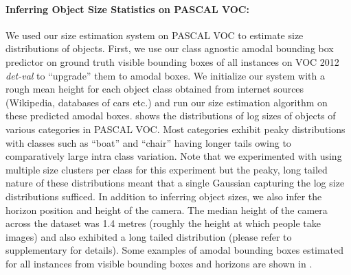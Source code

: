 \paragraph{Inferring Object Size Statistics on PASCAL VOC:} We used our size estimation system on PASCAL VOC to estimate size distributions of objects. First, we use our class agnostic amodal bounding box predictor on ground truth visible bounding boxes of all instances on VOC 2012 \textit{det-val} to ``upgrade'' them to amodal boxes. We initialize our system with a rough mean height for each object class obtained from internet sources (Wikipedia, databases of cars etc.) and run our size estimation algorithm on these predicted amodal boxes.  shows the distributions of log sizes of objects of various categories in PASCAL VOC. Most categories exhibit peaky distributions with classes such as ``boat'' and ``chair'' having longer tails owing to comparatively large intra class variation. Note that we experimented with using multiple size clusters per class for this experiment but the peaky, long tailed nature of these distributions meant that a single Gaussian capturing the log size distributions sufficed. In addition to inferring object sizes, we also infer the horizon position and height of the camera. The median height of the camera across the dataset was 1.4 metres (roughly the height at which people take images) and also exhibited a long tailed distribution (please refer to supplementary for details). Some examples of amodal bounding boxes estimated for all instances from visible bounding boxes and horizons are shown in .


